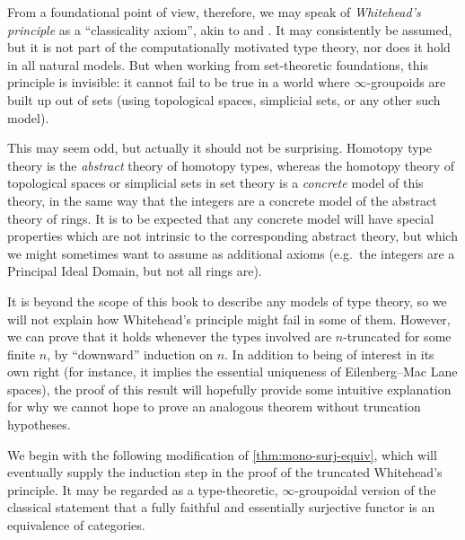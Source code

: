 {From a foundational point of view, therefore, we may speak of \emph{Whitehead's principle} as a ``classicality axiom'', akin to \LEM{} and \choice{}.
It may consistently be assumed, but it is not part of the computationally motivated type theory, nor does it hold in all natural models.
But when working from set-theoretic foundations, this principle is invisible: it cannot fail to be true in a world where $\infty$-groupoids are built up out of sets (using topological spaces, simplicial sets, or any other such model).

This may seem odd, but actually it should not be surprising.
Homotopy type theory is the \emph{abstract} theory of homotopy types, whereas the homotopy theory of topological spaces or simplicial sets in set theory is a \emph{concrete} model of this theory, in the same way that the integers are a concrete model of the abstract theory of rings.
It is to be expected that any concrete model will have special properties which are not intrinsic to the corresponding abstract theory, but which we might sometimes want to assume as additional axioms (e.g.\ the integers are a Principal Ideal Domain, but not all rings are).

It is beyond the scope of this book to describe any models of type theory, so we will not explain how Whitehead's principle might fail in some of them.
However, we can prove that it holds whenever the types involved are $n$-truncated for some finite $n$, by ``downward'' induction on $n$.
In addition to being of interest in its own right (for instance, it implies the essential uniqueness of Eilenberg--Mac Lane spaces), the proof of this result will hopefully provide some intuitive explanation for why we cannot hope to prove an analogous theorem without truncation hypotheses.

We begin with the following modification of \cref{thm:mono-surj-equiv}, which will eventually supply the induction step in the proof of the truncated Whitehead's principle.
It may be regarded as a type-theoretic, $\infty$-group\-oid\-al version of the classical statement that a fully faithful and essentially surjective functor is an equivalence of categories.

}
